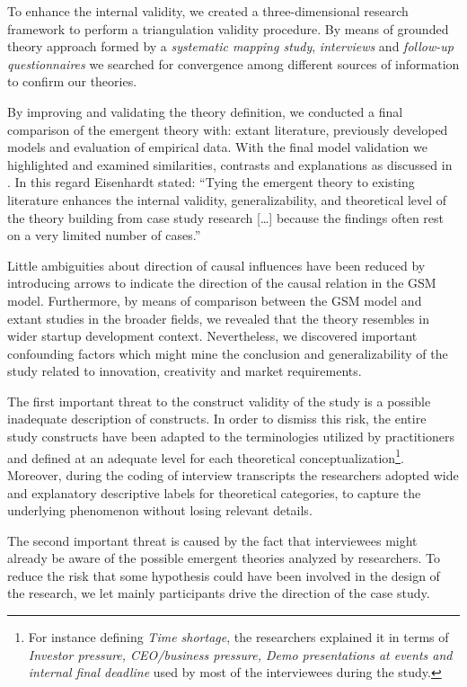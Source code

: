 \documentclass[10pt,journal,letterpaper,compsoc]{IEEEtran}
\begin{document}
To enhance the internal validity, we created a three-dimensional research 
framework to perform a triangulation validity procedure. By means of grounded 
theory approach formed by a \textit{systematic mapping study}, 
\textit{interviews} and  \textit{follow-up questionnaires} we searched for 
convergence among different sources of information to confirm our theories.

By improving and validating the theory definition, we conducted a final 
comparison of the emergent theory with: extant literature, previously developed 
models and evaluation of empirical data. With the final model validation we 
highlighted and examined similarities, contrasts and explanations as discussed 
in \cite{Eisenhardt2007}.  In this regard Eisenhardt stated: ``Tying the 
emergent theory to existing literature enhances the internal validity, 
generalizability, and theoretical level of the theory building from case study 
research [\ldots] because the findings often rest on a very limited number of 
cases.''

Little ambiguities about direction of causal influences have been reduced by 
introducing arrows to indicate the direction of the causal relation in the GSM 
model. Furthermore, by means of comparison between the GSM model and extant 
studies in the broader fields, we revealed that the theory resembles in wider 
startup development context. Nevertheless, we discovered important confounding 
factors which might mine the conclusion and generalizability of the study 
related to innovation, creativity and market requirements.

The first important threat to the construct validity of the study is a 
possible inadequate description of constructs. In order to dismiss this risk, 
the entire study constructs have been adapted to the terminologies utilized by 
practitioners and defined at an adequate level for each theoretical 
conceptualization\footnote{For instance defining \textit{Time shortage}, the 
researchers explained it in terms of \textit{Investor pressure, CEO/business 
pressure, Demo presentations at events and internal final deadline} used by most 
of the interviewees during the study.}. Moreover, during the coding of interview 
transcripts the researchers adopted wide and explanatory descriptive labels for 
theoretical categories, to capture the underlying phenomenon without losing 
relevant details.

The second important threat is caused by the fact that interviewees might 
already be aware of the possible emergent theories analyzed by researchers. To 
reduce the risk that some hypothesis could have been involved in the design of 
the research, we let mainly participants drive the direction of the case study.
\end{document}
